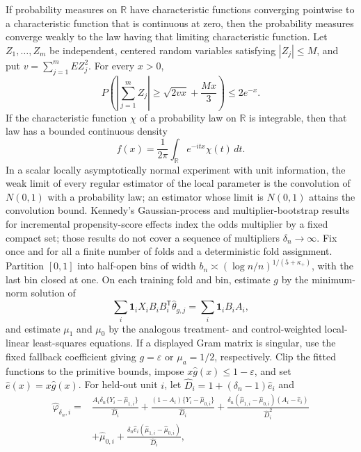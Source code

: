 If probability measures on \(\mathbb R\) have characteristic functions converging pointwise to a characteristic function that is continuous at zero, then the probability measures converge weakly to the law having that limiting characteristic function.
Let \(Z_1,\ldots,Z_m\) be independent, centered random variables satisfying \(|Z_j|\leq M\), and put \(v=\sum_{j=1}^m E Z_j^2\).  For every \(x>0\),
\[
 P\!\left(\left|\sum_{j=1}^m Z_j\right|\geq \sqrt{2vx}+\frac{Mx}{3}\right)\leq 2e^{-x}.
\]
If the characteristic function \(\chi\) of a probability law on \(\mathbb R\) is integrable, then that law has a bounded continuous density
\[
 f(x)=\frac{1}{2\pi}\int_{\mathbb R}e^{-itx}\chi(t)\,dt.
\]
In a scalar locally asymptotically normal experiment with unit information, the weak limit of every regular estimator of the local parameter is the convolution of \(N(0,1)\) with a probability law; an estimator whose limit is \(N(0,1)\) attains the convolution bound.
Kennedy's Gaussian-process and multiplier-bootstrap results for incremental propensity-score effects index the odds multiplier by a fixed compact set; those results do not cover a sequence of multipliers \(\delta_n\to\infty\).
Fix once and for all a finite number of folds and a deterministic fold assignment.  Partition \([0,1]\) into half-open bins of width \(b_n\asymp(\log n/n)^{1/(5+\kappa_+)}\), with the last bin closed at one.  On each training fold and bin, estimate \(g\) by the minimum-norm solution of
\[
 \sum_i\mathbf 1_i X_iB_iB_i^{\mathsf T}\widehat\theta_{g,j}
 =\sum_i\mathbf 1_iB_iA_i,
\]
and estimate \(\mu_1\) and \(\mu_0\) by the analogous treatment- and control-weighted local-linear least-squares equations.  If a displayed Gram matrix is singular, use the fixed fallback coefficient giving \(g=\varepsilon\) or \(\mu_a=1/2\), respectively.  Clip the fitted functions to the primitive bounds, impose \(x\widehat g(x)\leq1-\varepsilon\), and set \(\widehat e(x)=x\widehat g(x)\).  For held-out unit \(i\), let \(\widehat D_i=1+(\delta_n-1)\widehat e_i\) and
\[
\begin{split}
 \widehat\varphi_{\delta_n,i}={}&
 \frac{A_i\delta_n\{Y_i-\widehat\mu_{1,i}\}}{\widehat D_i}
 +\frac{(1-A_i)\{Y_i-\widehat\mu_{0,i}\}}{\widehat D_i}
 +\frac{\delta_n(\widehat\mu_{1,i}-\widehat\mu_{0,i})(A_i-\widehat e_i)}{\widehat D_i^2}\\
 &+\widehat\mu_{0,i}
 +\frac{\delta_n\widehat e_i(\widehat\mu_{1,i}-\widehat\mu_{0,i})}{\widehat D_i},
\end{split}
\]

